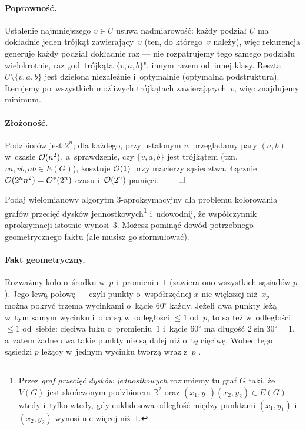 \paragraph{Poprawność.}
Ustalenie najmniejszego $v\in U$ usuwa nadmiarowość: każdy podział $U$ ma dokładnie
jeden trójkąt zawierający~$v$ (ten, do którego~$v$ należy), więc rekurencja generuje
każdy podział dokładnie raz --- nie rozpatrujemy tego samego podziału wielokrotnie,
raz „od~trójkąta $\{v,a,b\}$", innym razem od~innej klasy. Reszta $U\setminus\{v,a,b\}$
jest dzielona niezależnie i~optymalnie (optymalna podstruktura). Iterujemy po~wszystkich
możliwych trójkątach zawierających~$v$, więc znajdujemy minimum.

\paragraph{Złożoność.}
Podzbiorów jest $2^n$; dla każdego, przy ustalonym $v$, przeglądamy pary
$(a,b)$ w~czasie $\mathcal{O}(n^2)$, a~sprawdzenie, czy $\{v,a,b\}$ jest trójkątem
(tzn. $va,vb,ab\in E(G)$), kosztuje $\mathcal{O}(1)$ przy macierzy sąsiedztwa.
Łącznie $\mathcal{O}(2^n n^2)=\mathcal{O}^*(2^n)$ czasu
i~$\mathcal{O}(2^n)$ pamięci. $\qed$

\clearpage
\begin{zadanie}
	Podaj wielomianowy algorytm $3$-aproksymacyjny dla problemu kolorowania grafów
	przecięć dysków jednostkowych\footnote{Przez \emph{graf przecięć dysków
	jednostkowych} rozumiemy tu graf $G$ taki, że $V(G)$ jest skończonym podzbiorem
	$\mathbb{R}^2$ oraz $(x_1,y_1)(x_2,y_2)\in E(G)$ wtedy i~tylko wtedy, gdy
	euklidesowa odległość między punktami $(x_1,y_1)$ i~$(x_2,y_2)$ wynosi nie więcej
	niż~$1$.} i~udowodnij, że współczynnik aproksymacji istotnie wynosi~$3$. Możesz
	pominąć dowód potrzebnego geometrycznego faktu (ale musisz go sformułować).
\end{zadanie}

\label{sol:udg-coloring}
\paragraph{Fakt geometryczny.}
Rozważmy koło o~środku w~$p$ i~promieniu~$1$ (zawiera ono wszystkich sąsiadów
$p$). Jego lewą połowę --- czyli punkty o~współrzędnej $x$ nie większej niż~$x_p$
--- można pokryć trzema wycinkami o~kącie $60^\circ$ każdy. Jeżeli dwa punkty
leżą w~tym samym wycinku i~oba są w~odległości $\le 1$ od~$p$, to są też
w~odległości $\le 1$ od~siebie: cięciwa łuku o~promieniu~$1$ i~kącie $60^\circ$
ma długość $2\sin 30^\circ=1$, a~zatem żadne dwa takie punkty nie są dalej niż
o~tę cięciwę. Wobec tego sąsiedzi $p$ leżący w~jednym wycinku tworzą wraz z~$p$
.

